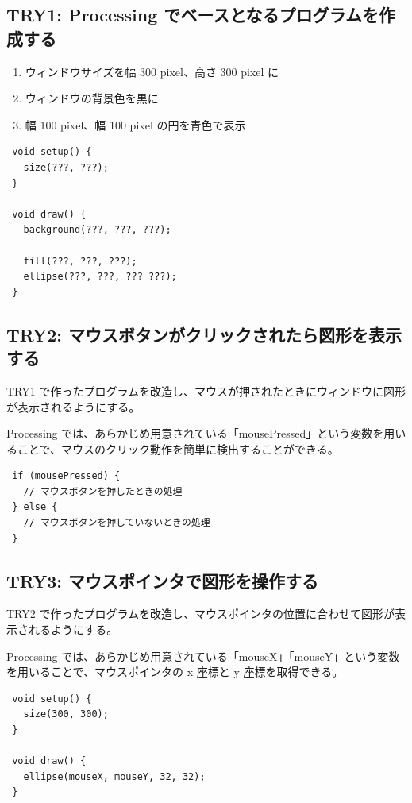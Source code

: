 \documentclass[11pt,a4paper]{jarticle}
\begin{document}
\subsection*{TRY1: Processing でベースとなるプログラムを作成する}
\begin{enumerate}
 \item ウィンドウサイズを幅 300 pixel、高さ 300 pixel に
 \item ウィンドウの背景色を黒に
 \item 幅 100 pixel、幅 100 pixel の円を青色で表示
\end{enumerate}

\begin{lstlisting}
 void setup() {
   size(???, ???);
 }

 void draw() {
   background(???, ???, ???);

   fill(???, ???, ???);
   ellipse(???, ???, ??? ???);
 }
\end{lstlisting}

\subsection*{TRY2: マウスボタンがクリックされたら図形を表示する}
TRY1 で作ったプログラムを改造し、マウスが押されたときにウィンドウに図形が表示されるようにする。

Processing では、あらかじめ用意されている「mousePressed」という変数を用いることで、マウスのクリック動作を簡単に検出することができる。
\begin{lstlisting}
 if (mousePressed) {
   // マウスボタンを押したときの処理
 } else {
   // マウスボタンを押していないときの処理
 }
\end{lstlisting}


\subsection*{TRY3: マウスポインタで図形を操作する}
TRY2 で作ったプログラムを改造し、マウスポインタの位置に合わせて図形が表示されるようにする。

Processing では、あらかじめ用意されている「mouseX」「mouseY」という変数を用いることで、マウスポインタの x 座標と y 座標を取得できる。


\begin{lstlisting}
 void setup() {
   size(300, 300);
 }

 void draw() {
   ellipse(mouseX, mouseY, 32, 32);
 }
\end{lstlisting}
\end{document}

